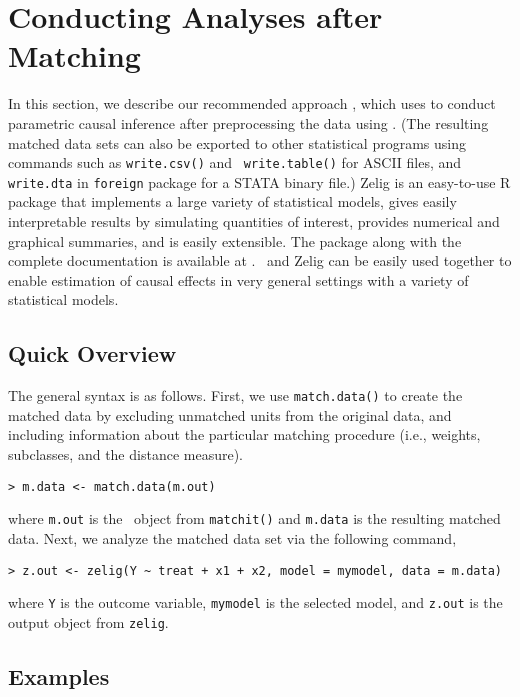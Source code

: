 \section{Conducting Analyses after Matching}
\label{sec:analysis}

In this section, we describe our recommended approach
\citep{HoImaKin05}, which uses
 to conduct parametric
causal inference after preprocessing the data using \MatchIt.  (The
resulting matched data sets can also be exported to other statistical
programs using commands such as {\tt write.csv()} and {\tt
  write.table()} for ASCII files, and {\tt write.dta} in {\tt foreign}
package for a STATA binary file.)  Zelig \citep{ImaKinLau04} is an
easy-to-use R package that implements a large variety of statistical
models, gives easily interpretable results by simulating quantities of
interest, provides numerical and graphical summaries, and is easily
extensible.  The package along with the complete documentation is
available at
.
\MatchIt\ and Zelig can be easily used together to enable estimation
of causal effects in very general settings with a variety of
statistical models.

\subsection{Quick Overview}

The general syntax is as follows. First, we use \texttt{match.data()}
to create the matched data by excluding unmatched units from the
original data, and including information about the particular matching
procedure (i.e., weights, subclasses, and the distance measure).
\begin{verbatim}
> m.data <- match.data(m.out)
\end{verbatim}
where {\tt m.out} is the \MatchIt\ object from {\tt matchit()} and
{\tt m.data} is the resulting matched data.  Next, we analyze the
matched data set via the following command,
\begin{verbatim}
> z.out <- zelig(Y ~ treat + x1 + x2, model = mymodel, data = m.data)
\end{verbatim}

where {\tt Y} is the outcome variable, {\tt mymodel} is the selected
model, and {\tt z.out} is the output object from {\tt zelig}.

\subsection{Examples}

